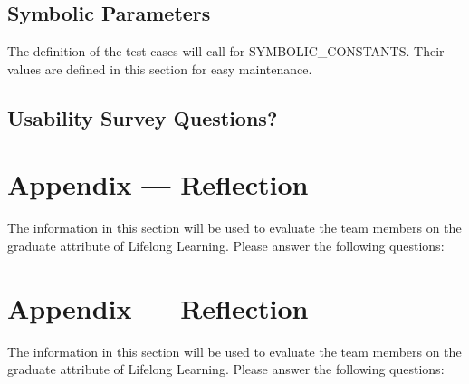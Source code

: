 \documentclass[12pt, titlepage]{article}
\begin{document}
	\subsection{Symbolic Parameters}
	
	The definition of the test cases will call for SYMBOLIC\_CONSTANTS.
	Their values are defined in this section for easy maintenance.
	
	\subsection{Usability Survey Questions?}
	
	
	\newpage{}
	\section*{Appendix --- Reflection}
	
	The information in this section will be used to evaluate the team members on the
	graduate attribute of Lifelong Learning.  Please answer the following questions:
	
	\newpage{}
	\section*{Appendix --- Reflection}
	
	The information in this section will be used to evaluate the team members on the
	graduate attribute of Lifelong Learning.  Please answer the following questions:
	
\end{document}
